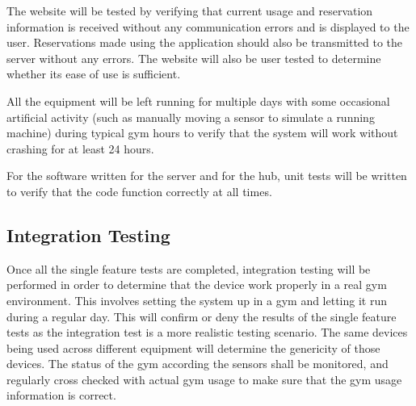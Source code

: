 \documentclass[PPFS.tex]{template/subfiles}
\begin{document}
The website will be tested by verifying that current usage and reservation information is received without any communication errors and is displayed to the user. Reservations made using the application should also be transmitted to the server without any errors. The website will also be user tested to determine whether its ease of use is sufficient.

All the equipment will be left running for multiple days with some occasional artificial activity (such as manually moving a sensor to simulate a running machine) during typical gym hours to verify that the system will work without crashing for at least 24 hours.

For the software written for the server and for the hub, unit tests will be written to verify that the code function correctly at all times.

\subsection{Integration Testing}

Once all the single feature tests are completed, integration testing will be performed in order to determine that the device work properly in a real gym environment. This involves setting the system up in a gym and letting it run during a regular day. This will confirm or deny the results of the single feature tests as the integration test is a more realistic testing scenario. The same devices being used across different equipment will determine the genericity of those devices. The status of the gym according the sensors shall be monitored, and regularly cross checked with actual gym usage to make sure that the gym usage information is correct. 
\end{document}
